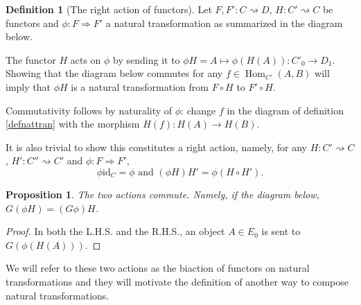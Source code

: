 \documentclass{article}
\newtheorem{prop}[thm]{Proposition}
\theoremstyle{definition}
\newtheorem{defn}[thm]{Definition}
\theoremstyle{remark}
\DeclareMathOperator{\Hom}{Hom}
\newcommand{\id}{\text{id}}
\begin{document}
\begin{defn}[The right action of functors]
	Let $F,F':C\rightsquigarrow D$, $H:C'\rightsquigarrow C$ be functors and $\phi:F\Rightarrow F'$ a natural transformation as summarized in the diagram below.
	\begin{figure}[h]
		\centering
	\end{figure}
	
	The functor $H$ acts on $\phi$ by sending it to $\phi H = A \mapsto \phi(H(A)) : C'_0 \rightarrow D_1$. Showing that the diagram below commutes for any $f \in \Hom_{C'}(A,B)$ will imply that $\phi H$ is a natural transformation from $F\circ H$ to $F'\circ H$.
	\begin{figure}[h]
		\centering
	\end{figure}

	Commutativity follows by naturality of $\phi$: change $f$ in the diagram of definition \ref{defnattran} with the morphism $H(f):H(A) \rightarrow H(B)$.
	
	It is also trivial to show this constitutes a right action, namely, for any $H:C'\rightsquigarrow C$, $H':C''\rightsquigarrow C'$ and $\phi:F\Rightarrow F'$,
	\[\phi \id_C = \phi \text{ and } (\phi H)H' = \phi(H \circ H').\]
\end{defn}

\begin{prop}
	The two actions commute. Namely, if the diagram below, $G(\phi H) = (G\phi) H$.
	\begin{figure}[h]
		\centering
	\end{figure}
\end{prop}
\begin{proof}
In both the L.H.S. and the R.H.S., an object $A \in E_0$ is sent to $G(\phi(H(A)))$.
\end{proof}
We will refer to these two actions as the biaction of functors on natural transformations and they will motivate the definition of another way to compose natural transformations.
\end{document}
